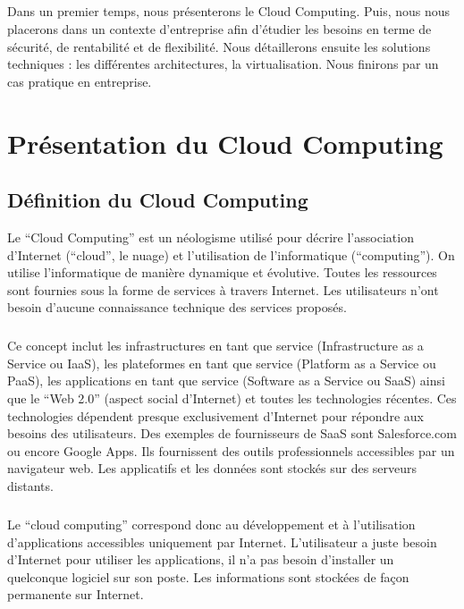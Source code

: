 \documentclass[a4paper,12pt]{report}
\begin{document}
\begin{onehalfspace}
	\paragraph*{}
	Dans un premier temps, nous présenterons le Cloud Computing. Puis, nous nous placerons dans un contexte d’entreprise afin d’étudier les besoins en terme de sécurité, de rentabilité et de flexibilité. Nous détaillerons ensuite les solutions techniques : les différentes architectures, la virtualisation. Nous finirons par un cas pratique en entreprise.
	
	
	
	\chapter{Présentation du Cloud Computing}


	\section{Définition du Cloud Computing}
	
	Le “Cloud Computing” est un néologisme utilisé pour décrire l’association d’Internet (“cloud”, le nuage) et l’utilisation de l’informatique (“computing”). On utilise l’informatique de manière dynamique et évolutive. Toutes les ressources sont fournies sous la forme de services à travers Internet. Les utilisateurs n’ont besoin d’aucune connaissance technique des services proposés.

	\paragraph*{}
	Ce concept inclut les infrastructures en tant que service (Infrastructure as a Service ou IaaS), les plateformes en tant que service (Platform as a Service ou PaaS), les applications en tant que service (Software as a Service ou SaaS) ainsi que le “Web 2.0” (aspect social d’Internet) et toutes les technologies récentes. Ces technologies dépendent presque exclusivement d’Internet pour répondre aux besoins des utilisateurs. Des exemples de fournisseurs de SaaS sont Salesforce.com ou encore Google Apps. Ils fournissent des outils professionnels accessibles par un navigateur web. Les applicatifs et les données sont stockés sur des serveurs distants.
	
	\paragraph*{}
	Le “cloud computing” correspond donc au développement et à l’utilisation d’applications accessibles uniquement par Internet. L’utilisateur a juste besoin d’Internet pour utiliser les applications, il n’a pas besoin d’installer un quelconque logiciel sur son poste. Les informations sont stockées de façon permanente sur Internet.
	

\end{onehalfspace}
\end{document}
